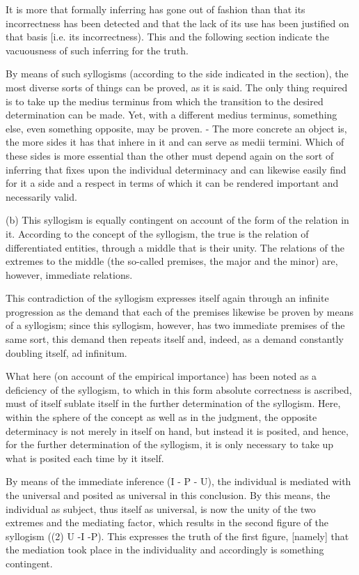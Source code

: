It is more that formally inferring has gone out of fashion than that
its incorrectness has been detected and that the lack of its use has
been justified on that basis [i.e. its incorrectness). This and the
following section indicate the vacuousness of such
inferring for the truth.

By means of such syllogisms (according to the side indicated in
the section), the most diverse sorts of things can be proved, as it is
said. The only thing required is to take up the medius terminus from
which the transition to the desired determination can be made. Yet,
with a different medius terminus, something else, even something
opposite, may be proven. - The more concrete an object is, the more
sides it has that inhere in it and can serve as medii termini. Which of
these sides is more essential than the other must depend again on the
sort of inferring that fixes upon the individual determinacy and can
likewise easily find for it a side and a respect in terms of which it can
be rendered important and necessarily valid.

(b) This syllogism is equally contingent on account of
the form of the relation in it.
According to the concept of the syllogism,
the true is the relation of differentiated entities,
through a middle that is their unity.
The relations of the extremes to the middle
(the so-called premises, the major and the minor)
are, however, immediate relations.

This contradiction of the syllogism expresses itself again through an
infinite progression as the demand that each of the premises
likewise be proven by means of a syllogism; since this syllogism,
however, has two immediate premises of the same sort, this demand
then repeats itself and, indeed, as a demand constantly doubling
itself, ad infinitum.

What here (on account of the empirical importance) has been noted as
a deficiency of the syllogism, to which in this form absolute correctness
is ascribed, must of itself sublate itself in the
further determination of the syllogism. Here, within the sphere of the
concept as well as in the judgment, the opposite determinacy is not merely
in itself on hand, but instead it is posited, and hence, for the further
determination of the syllogism, it is only necessary to take up what is
posited each time by it itself.

By means of the immediate inference (I - P - U), the individual is
mediated with the universal and posited as universal in this conclusion.
By this means, the individual as subject, thus itself as universal,
is now the unity of the two extremes and the mediating factor, which results
in the second figure of the syllogism ((2) U -I -P). This expresses the truth of
the first figure, [namely] that the mediation took place in the individuality
and accordingly is something contingent.

